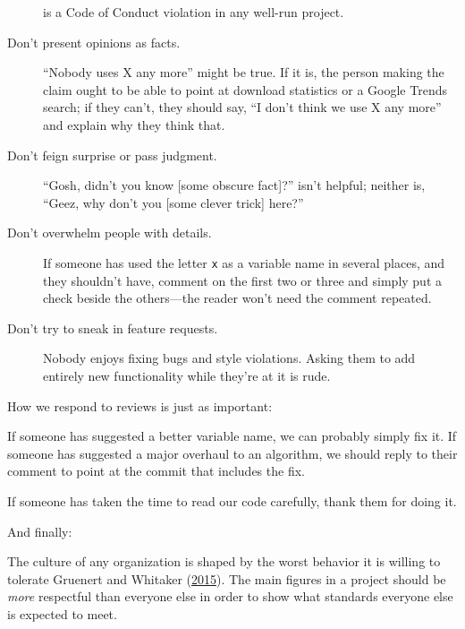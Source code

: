 \documentclass[
]{krantz}
\providecommand{\tightlist}{%
  \setlength{\itemsep}{0pt}\setlength{\parskip}{0pt}}
\begin{document}
\begin{description}
is a Code of Conduct violation in any well-run project.
\item[Don't present opinions as facts.]
``Nobody uses X any more'' might be true.
If it is,
the person making the claim ought to be able to point at download statistics
or a Google Trends search;
if they can't,
they should say,
``I don't think we use X any more'' and explain why they think that.
\item[Don't feign surprise or pass judgment.]
``Gosh, didn't you know {[}some obscure fact{]}?'' isn't helpful;
neither is, ``Geez, why don't you {[}some clever trick{]} here?''
\item[Don't overwhelm people with details.]
If someone has used the letter \texttt{x} as a variable name in several places,
and they shouldn't have,
comment on the first two or three and simply put a check beside the others---the reader
won't need the comment repeated.
\item[Don't try to sneak in feature requests.]
Nobody enjoys fixing bugs and style violations.
Asking them to add entirely new functionality while they're at it is rude.
\end{description}

How we respond to reviews is just as important:

\begin{description}
\tightlist
\item[Be specific in replies to reviewers.]
If someone has suggested a better variable name,
we can probably simply fix it.
If someone has suggested a major overhaul to an algorithm,
we should reply to their comment to point at the commit that includes the fix.
\item[Thank our reviewers.]
If someone has taken the time to read our code carefully,
thank them for doing it.
\end{description}

And finally:

\begin{description}
\tightlist
\item[Don't let people break these rules just because they're frequent contributors or in positions of power.]
The culture of any organization is shaped by the worst behavior it is willing to tolerate Gruenert and Whitaker (\protect\hyperlink{ref-Grue2015}{2015}).
The main figures in a project should be \emph{more} respectful than everyone else
in order to show what standards everyone else is expected to meet.
\end{description}
\end{document}
